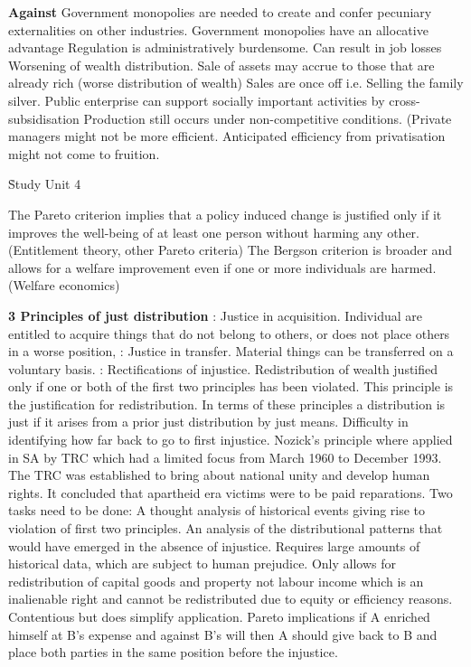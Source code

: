 \documentclass[12pt]{examnotes}
\begin{document}
{\bf Against}
\ra Government monopolies are needed to create and confer pecuniary externalities on other industries. 
\ra Government monopolies have an allocative advantage
\ra Regulation is administratively burdensome.
\ra Can result in job losses
\ra Worsening of wealth distribution.
\ra Sale of assets may accrue to those that are already rich (worse distribution of wealth)
\ra Sales are once off i.e. Selling the family silver.
\ra Public enterprise can support socially important activities by cross-subsidisation
\ra Production still occurs under non-competitive conditions. (Private managers might not be more efficient.
\ra Anticipated efficiency from privatisation might not come to fruition.

\h{Study Unit 4}

\ra The Pareto criterion implies that a policy induced change is justified only if it improves the well-being of at least one person without harming any other. (Entitlement theory, other Pareto criteria)
\ra The Bergson criterion is broader and allows for a welfare improvement even if one or more individuals are harmed. (Welfare economics)

{\bf 3 Principles of just distribution}
: Justice in acquisition. Individual are entitled to acquire things that do not belong to others, or does not place others in a worse position, 
: Justice in transfer. Material things can be transferred on a voluntary basis.
: Rectifications of injustice. Redistribution of wealth justified only if one or both of the first two principles has been violated. This principle is the justification for redistribution.
\ra In terms of these principles a distribution is just if it arises from a prior just distribution by just means.
\ra Difficulty in identifying how far back to go to first injustice.
\ra Nozick's principle where applied in SA by TRC which had a limited focus from March 1960 to December 1993. The TRC was established to bring about national unity and develop human rights. It concluded that apartheid era victims were to be paid reparations.
\ra Two tasks need to be done:
 A thought analysis of historical events giving rise to violation of first two principles.
 An analysis of the distributional patterns that would have emerged in the absence of injustice.
\ra Requires large amounts of historical data, which are subject to human prejudice.
\ra Only allows for redistribution of capital goods and property not labour income which is an inalienable right and cannot be redistributed due to equity or efficiency reasons. Contentious but does simplify application.
\ra Pareto implications if A enriched himself at B's expense and against B's will then A should give back to B and place both parties in the same position before the injustice.
\end{document}
